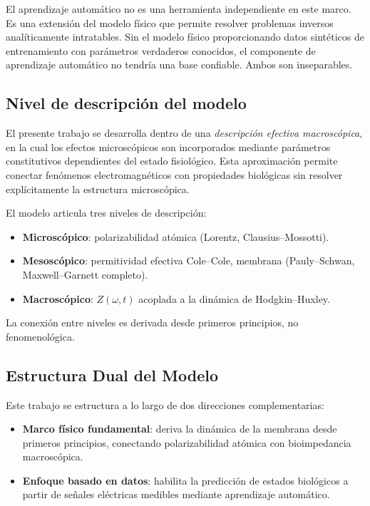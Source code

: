 \documentclass[12pt]{article}
\begin{document}
El aprendizaje autom\'atico no es una herramienta independiente en este marco. Es una
extensi\'on del modelo f\'isico que permite resolver problemas inversos anal\'iticamente
intratables. Sin el
modelo f\'isico proporcionando datos sint\'eticos de entrenamiento con par\'ametros verdaderos
conocidos, el componente de aprendizaje autom\'atico no tendr\'ia una base confiable. Ambos
son inseparables.

\subsection{Nivel de descripci\'on del modelo}
\label{sec:nivel_descripcion}

El presente trabajo se desarrolla dentro de una
\emph{descripci\'on efectiva macrosc\'opica}, en la cual
los efectos microsc\'opicos son incorporados mediante
par\'ametros constitutivos dependientes del estado
fisiol\'ogico. Esta aproximaci\'on permite conectar
fen\'omenos electromagn\'eticos con propiedades biol\'ogicas
sin resolver expl\'icitamente la estructura microsc\'opica.

El modelo articula tres niveles de descripci\'on:
\begin{itemize}
\item \textbf{Microsc\'opico}: polarizabilidad at\'omica
(Lorentz, Clausius--Mossotti).
\item \textbf{Mesosc\'opico}: permitividad efectiva
Cole--Cole, membrana (Pauly--Schwan,
Maxwell--Garnett completo).
\item \textbf{Macrosc\'opico}: $Z(\omega, t)$ acoplada
a la din\'amica de Hodgkin--Huxley.
\end{itemize}
La conexi\'on entre niveles es derivada desde primeros
principios, no fenomenol\'ogica.

\subsection{Estructura Dual del Modelo}

Este trabajo se estructura a lo largo de dos direcciones complementarias:
\begin{itemize}
\item \textbf{Marco f\'isico fundamental}: deriva la din\'amica de la membrana desde primeros
principios, conectando polarizabilidad at\'omica con bioimpedancia macrosc\'opica.
\item \textbf{Enfoque basado en datos}: habilita la predicci\'on de estados biol\'ogicos
a partir de se\~{n}ales el\'ectricas medibles mediante aprendizaje autom\'atico.
\end{itemize}
\end{document}
